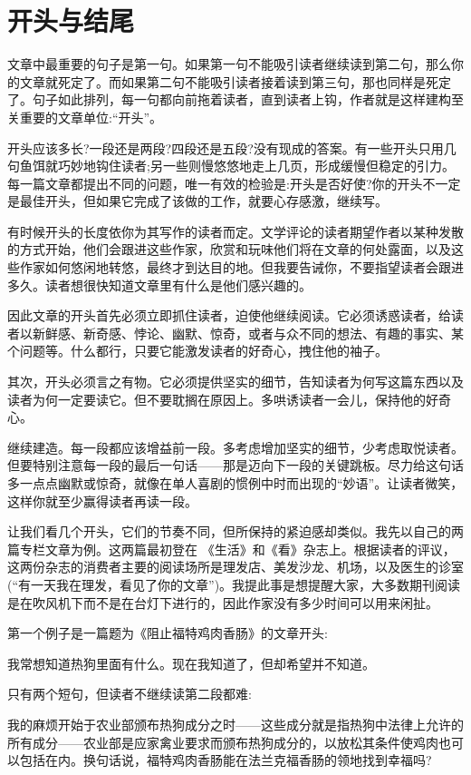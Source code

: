 \chapter{开头与结尾}
文章中最重要的句子是第一句。如果第一句不能吸引读者继续读到第二句，那么你的文章就死定了。而如果第二句不能吸引读者接着读到第三句，那也同样是死定了。句子如此排列，每一句都向前拖着读者，直到读者上钩，作者就是这样建构至关重要的文章单位:“开头”。

开头应该多长?一段还是两段?四段还是五段?没有现成的答案。有一些开头只用几句鱼饵就巧妙地钩住读者;另一些则慢悠悠地走上几页，形成缓慢但稳定的引力。每一篇文章都提出不同的问题，唯一有效的检验是:开头是否好使?你的开头不一定是最佳开头，但如果它完成了该做的工作，就要心存感激，继续写。

有时候开头的长度依你为其写作的读者而定。文学评论的读者期望作者以某种发散的方式开始，他们会跟进这些作家，欣赏和玩味他们将在文章的何处露面，以及这些作家如何悠闲地转悠，最终才到达目的地。但我要告诫你，不要指望读者会跟进多久。读者想很快知道文章里有什么是他们感兴趣的。

因此文章的开头首先必须立即抓住读者，迫使他继续阅读。它必须诱惑读者，给读者以新鲜感、新奇感、悖论、幽默、惊奇，或者与众不同的想法、有趣的事实、某个问题等。什么都行，只要它能激发读者的好奇心，拽住他的袖子。

其次，开头必须言之有物。它必须提供坚实的细节，告知读者为何写这篇东西以及读者为何一定要读它。但不要耽搁在原因上。多哄诱读者一会儿，保持他的好奇心。

继续建造。每一段都应该增益前一段。多考虑增加坚实的细节，少考虑取悦读者。但要特别注意每一段的最后一句话——那是迈向下一段的关键跳板。尽力给这句话多一点点幽默或惊奇，就像在单人喜剧的惯例中时而出现的“妙语”。让读者微笑，这样你就至少赢得读者再读一段。

让我们看几个开头，它们的节奏不同，但所保持的紧迫感却类似。我先以自己的两篇专栏文章为例。这两篇最初登在 《生活》和《看》杂志上。根据读者的评议，这两份杂志的消费者主要的阅读场所是理发店、美发沙龙、机场，以及医生的诊室(“有一天我在理发，看见了你的文章”)。我提此事是想提醒大家，大多数期刊阅读是在吹风机下而不是在台灯下进行的，因此作家没有多少时间可以用来闲扯。

第一个例子是一篇题为《阻止福特鸡肉香肠》的文章开头:

我常想知道热狗里面有什么。现在我知道了，但却希望并不知道。

只有两个短句，但读者不继续读第二段都难:

我的麻烦开始于农业部颁布热狗成分之时——这些成分就是指热狗中法律上允许的所有成分——农业部是应家禽业要求而颁布热狗成分的，以放松其条件使鸡肉也可以包括在内。换句话说，福特鸡肉香肠能在法兰克福香肠的领地找到幸福吗?

